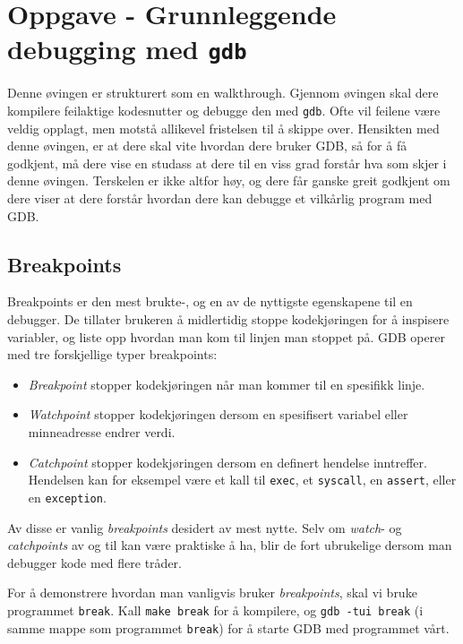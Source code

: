 \section{Oppgave - Grunnleggende debugging med \texttt{gdb}}\label{sec:3-oppgave}

Denne øvingen er strukturert som en walkthrough. Gjennom øvingen skal dere kompilere feilaktige kodesnutter og debugge den med \verb|gdb|. Ofte vil feilene være veldig opplagt, men motstå allikevel fristelsen til å skippe over. Hensikten med denne øvingen, er at dere skal vite hvordan dere bruker GDB, så for å få godkjent, må dere vise en studass at dere til en viss grad forstår hva som skjer i denne øvingen. Terskelen er ikke altfor høy, og dere får ganske greit godkjent om dere viser at dere forstår hvordan dere kan debugge et vilkårlig program med GDB.

\subsection{Breakpoints}

Breakpoints er den mest brukte-, og en av de nyttigste egenskapene til en debugger. De tillater brukeren å midlertidig stoppe kodekjøringen for å inspisere variabler, og liste opp hvordan man kom til linjen man stoppet på. GDB operer med tre forskjellige typer breakpoints:

\begin{itemize}
    \item \textit{Breakpoint} stopper kodekjøringen når man kommer til en spesifikk linje.
    \item \textit{Watchpoint} stopper kodekjøringen dersom en spesifisert variabel eller minneadresse endrer verdi.
    \item \textit{Catchpoint} stopper kodekjøringen dersom en definert hendelse inntreffer. Hendelsen kan for eksempel være et kall til \verb|exec|, et \verb|syscall|, en \verb|assert|, eller en \verb|exception|.
\end{itemize}

Av disse er vanlig \textit{breakpoints} desidert av mest nytte. Selv om \textit{watch}- og \textit{catchpoints} av og til kan være praktiske å ha, blir de fort ubrukelige dersom man debugger kode med flere tråder.

For å demonstrere hvordan man vanligvis bruker \textit{breakpoints}, skal vi bruke programmet \verb|break|. Kall \verb|make break| for å kompilere, og \verb|gdb -tui break| (i samme mappe som programmet \verb|break|) for å starte GDB med programmet vårt. 

